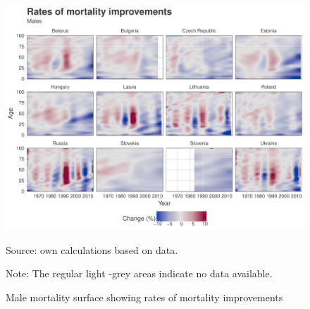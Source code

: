 \documentclass{article}
\begin{document}
\begin{landscape}
\begin{table}
\end{table}
\end{landscape}

\newpage

\begin{figure}[h!]
\caption{Male mortality surface showing rates of mortality improvements}
\label{Fig_ROMI}
\centering
\begin{center}
\includegraphics[scale=.55]{Figures/Romi_males.pdf}
\end{center}
Source: own calculations based on \citet{HMD} data. 
\begin{small}
Note: The regular light -grey areas indicate no data available.
\end{small}
\end{figure}
\end{document}
